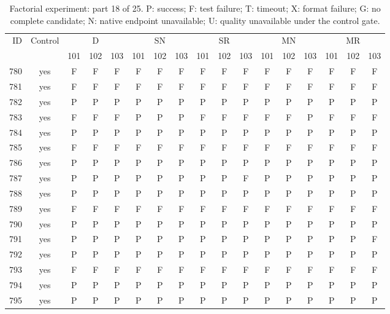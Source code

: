 \begin{table}[p]\centering\footnotesize
\setlength{\tabcolsep}{3pt}
\caption{Factorial experiment: part 18 of 25. P: success; F: test failure; T: timeout; X: format failure; G: no complete candidate; N: native endpoint unavailable; U: quality unavailable under the control gate.}
\begin{tabular*}{\textwidth}{@{\extracolsep{\fill}}rcccccccccccccccc}\toprule
ID & Control & \multicolumn{3}{c}{D} & \multicolumn{3}{c}{SN} & \multicolumn{3}{c}{SR} & \multicolumn{3}{c}{MN} & \multicolumn{3}{c}{MR}\\
\cmidrule(lr){3-5}\cmidrule(lr){6-8}\cmidrule(lr){9-11}\cmidrule(lr){12-14}\cmidrule(lr){15-17}
 & & 101 & 102 & 103 & 101 & 102 & 103 & 101 & 102 & 103 & 101 & 102 & 103 & 101 & 102 & 103\\\midrule
780 & yes & F & F & F & F & F & F & F & F & F & F & F & F & F & F & F\\
781 & yes & F & F & F & F & F & F & F & F & F & F & F & F & F & F & F\\
782 & yes & P & P & P & P & P & P & P & P & P & P & P & P & P & P & P\\
783 & yes & F & F & F & P & P & P & F & F & F & F & F & P & F & F & F\\
784 & yes & P & P & P & P & P & P & P & P & P & P & P & P & P & P & P\\
785 & yes & F & F & F & F & F & F & F & F & F & F & F & F & F & F & F\\
786 & yes & P & P & P & P & P & P & P & P & P & P & P & P & P & P & P\\
787 & yes & P & P & P & P & P & P & P & P & F & P & P & P & P & P & P\\
788 & yes & P & P & P & P & P & P & P & P & P & P & P & P & P & P & P\\
789 & yes & F & F & F & F & F & F & F & F & F & F & F & F & F & F & F\\
790 & yes & P & P & P & P & P & P & P & P & P & P & P & P & P & P & P\\
791 & yes & P & P & P & P & P & P & P & P & P & P & P & P & P & P & F\\
792 & yes & P & P & P & P & P & P & P & P & P & P & P & P & P & P & P\\
793 & yes & F & F & F & F & F & F & F & F & F & F & F & F & F & F & F\\
794 & yes & P & P & P & P & P & P & P & P & P & P & P & P & P & P & P\\
795 & yes & P & P & P & P & P & P & P & P & P & P & P & P & P & P & P\\

\end{tabular*}
\end{table}
